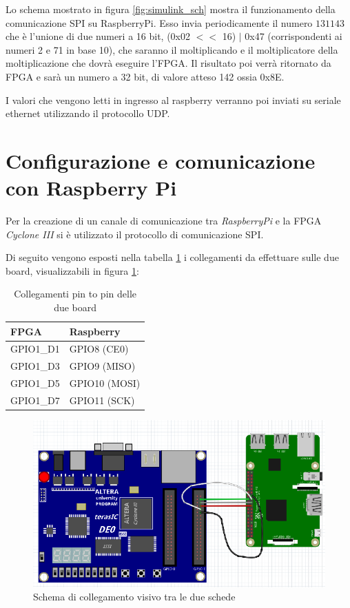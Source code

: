 \documentclass[titlepage]{report}
\begin{document}
		Lo schema mostrato in figura \ref{fig:simulink_sch} mostra il funzionamento della comunicazione SPI su RaspberryPi. Esso invia periodicamente il numero $131143$ che è l'unione di due numeri a 16 bit, (0x02 $<<$ 16) $\mid$ 0x47 (corrispondenti ai numeri 2 e 71 in base 10), che saranno il moltiplicando e il moltiplicatore della moltiplicazione che dovrà eseguire l'FPGA. Il risultato poi verrà ritornato da FPGA e sarà un numero a 32 bit, di valore atteso 142 ossia 0x8E.

		I valori che vengono letti in ingresso al raspberry verranno poi inviati su seriale ethernet utilizzando il protocollo UDP.

	\section*{Configurazione e comunicazione con Raspberry Pi}
	\label{sec:configurazione_raspberrypi}
			
		Per la creazione di un canale di comunicazione tra \textit{RaspberryPi} e la FPGA \textit{Cyclone III} si è utilizzato il protocollo di comunicazione SPI.

		Di seguito vengono esposti nella tabella \ref{tab:wiring} i collegamenti da effettuare sulle due board, visualizzabili in figura \ref{fig:wiring}:

		\begin{table}[ht]
			\centering
			\begin{tabular}{|l|l|}
				\rowcolor{gray!25} %
				\hline
				\textbf{FPGA} & \textbf{Raspberry} \\
				\hline
				GPIO1\_D1 & GPIO8 (CE0) \\
				\hline
				GPIO1\_D3 & GPIO9 (MISO) \\
				\hline
				GPIO1\_D5 & GPIO10 (MOSI) \\
				\hline
				GPIO1\_D7 & GPIO11 (SCK) \\
				\hline
			\end{tabular}
			\caption{Collegamenti pin to pin delle due board}
			\label{tab:wiring}
		\end{table}

		\begin{figure}[ht]
			\centering
			\includegraphics[scale=0.6]{./img/link_fpga_raspi.png}
			\caption{Schema di collegamento visivo tra le due schede}
			\label{fig:wiring}
		\end{figure}
\end{document}
